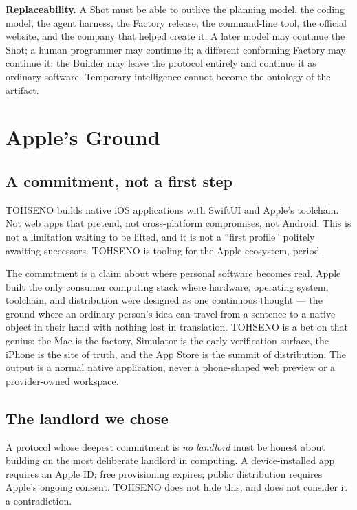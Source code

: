 \documentclass[11pt]{article}
\newcommand{\TOH}{TOHSENO}
\begin{document}
\textbf{Replaceability.} A Shot must be able to outlive the planning
model, the coding model, the agent harness, the Factory release, the
command-line tool, the official website, and the company that helped
create it. A later model may continue the Shot; a human programmer may
continue it; a different conforming Factory may continue it; the Builder
may leave the protocol entirely and continue it as ordinary software.
Temporary intelligence cannot become the ontology of the artifact.

\section{Apple's Ground}

\subsection{A commitment, not a first step}

\TOH{} builds native iOS applications with SwiftUI and Apple's
toolchain. Not web apps that pretend, not cross-platform compromises,
not Android. This is not a limitation waiting to be lifted, and it is
not a ``first profile'' politely awaiting successors. \TOH{} is tooling
for the Apple ecosystem, period.

The commitment is a claim about where personal software becomes real.
Apple built the only consumer computing stack where hardware, operating
system, toolchain, and distribution were designed as one continuous
thought --- the ground where an ordinary person's idea can travel from a
sentence to a native object in their hand with nothing lost in
translation. \TOH{} is a bet on that genius: the Mac is the factory,
Simulator is the early verification surface, the iPhone is the site of
truth, and the App Store is the summit of distribution. The output is a
normal native application, never a phone-shaped web preview or a
provider-owned workspace.

\subsection{The landlord we chose}

A protocol whose deepest commitment is \emph{no landlord} must be honest
about building on the most deliberate landlord in computing. A
device-installed app requires an Apple ID; free provisioning expires;
public distribution requires Apple's ongoing consent. \TOH{} does not
hide this, and does not consider it a contradiction.
\end{document}
